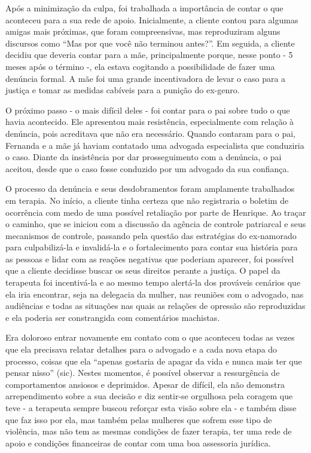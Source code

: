 Após a minimização da culpa, foi trabalhada a importância de contar o que aconteceu para a sua rede de apoio. Inicialmente, a cliente contou para algumas amigas mais próximas, que foram compreensivas, mas reproduziram alguns discursos como ``Mas por que você não terminou antes?''. Em seguida, a cliente decidiu que deveria contar para a mãe, principalmente porque, nesse ponto - 5 meses após o término -, ela estava cogitando a possibilidade de fazer uma denúncia formal. A mãe foi uma grande incentivadora de levar o caso para a justiça e tomar as medidas cabíveis para a punição do ex-genro.

O próximo passo - o mais difícil deles - foi contar para o pai sobre tudo o que havia acontecido. Ele apresentou mais resistência, especialmente com relação à denúncia, pois acreditava que não era necessário. Quando contaram para o pai, Fernanda e a mãe já haviam contatado uma advogada especialista que conduziria o caso. Diante da insistência por dar prosseguimento com a denúncia, o pai aceitou, desde que o caso fosse conduzido por um advogado da sua confiança. 

O processo da denúncia e seus desdobramentos foram amplamente trabalhados em terapia. No início, a cliente tinha certeza que não registraria o boletim de ocorrência com medo de uma possível retaliação por parte de Henrique. Ao traçar o caminho, que se iniciou com a discussão da agência de controle patriarcal e seus mecanismos de controle, passando pela questão das estratégias do ex-namorado para culpabilizá-la e invalidá-la e o fortalecimento para contar sua história para as pessoas e lidar com as reações negativas que poderiam aparecer, foi possível que a cliente decidisse buscar os seus direitos perante a justiça. O papel da terapeuta foi incentivá-la e ao mesmo tempo alertá-la dos prováveis cenários que ela iria encontrar, seja na delegacia da mulher, nas reuniões com o advogado, nas audiências e todas as situações nas quais as relações de opressão são reproduzidas e ela poderia ser constrangida com comentários machistas.

Era doloroso entrar novamente em contato com o que aconteceu todas as vezes que ela precisava relatar detalhes para o advogado e a cada nova etapa do processo, coisas que ela ``apenas gostaria de apagar da vida e nunca mais ter que pensar nisso'' (sic). Nestes momentos, é possível observar a ressurgência de comportamentos ansiosos e deprimidos. Apesar de difícil, ela não demonstra arrependimento sobre a sua decisão e diz sentir-se orgulhosa pela coragem que teve - a terapeuta sempre buscou reforçar esta visão sobre ela - e também disse que faz isso por ela, mas também pelas mulheres que sofrem esse tipo de violência, mas não tem as mesmas condições de fazer terapia, ter uma rede de apoio e condições financeiras de contar com uma boa assessoria jurídica.

